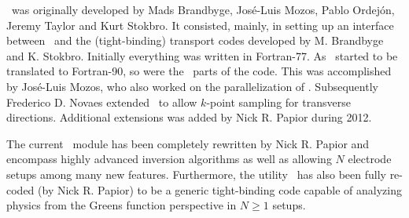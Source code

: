 \tsiesta\ was originally developed by Mads Brandbyge, Jos\'e-Luis
Mozos, Pablo Ordej\'on, Jeremy Taylor and Kurt
Stokbro\cite{Brandbyge2002}. It consisted, mainly, in setting up an
interface between \siesta\ and the (tight-binding) transport codes
developed by M. Brandbyge and K. Stokbro. Initially everything was
written in Fortran-77. As \siesta\ started to be translated to
Fortran-90, so were the \tsiesta\ parts of the code. This was
accomplished by Jos\'e-Luis Mozos, who also worked on the
parallelization of \tsiesta.
%
Subsequently Frederico D. Novaes extended \tsiesta\ to allow $k$-point
sampling for transverse directions. Additional extensions was
added by Nick R. Papior during 2012.

The current \tsiesta\ module has been completely rewritten by Nick
R. Papior and encompass highly advanced inversion algorithms as well
as allowing $N$ electrode setups among many new features. Furthermore,
the utility \tbtrans\ has also been fully re-coded (by Nick R. Papior)
to be a generic tight-binding code capable of analyzing physics from
the Greens function perspective in $N\ge1$ setups\cite{Papior2017}.


